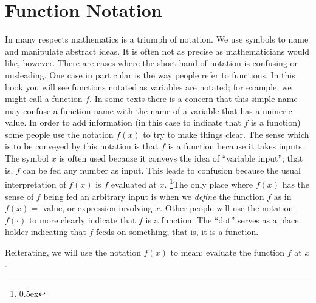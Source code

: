 \section{Function Notation}
In many respects mathematics is a triumph of notation. We use symbols to name 
and manipulate abstract ideas. It is often not as precise as mathematicians 
would like, however. There are cases where the short 
hand of notation is confusing 
or misleading. One case in particular is the way people refer to 
functions.
In this book you will see functions notated as variables are notated; for example, we might call a function $f$.
 In some texts there is a concern that this simple name may confuse a function name with the name 
of a variable that has a numeric value. In order to add information 
(in this case to indicate that $f$ is a function)  some 
people use the notation $f(x)$ to try to make things clear. The sense which is 
to be conveyed by this notation is that $f$ is a function because
it takes inputs. The symbol $x$ is often used because it conveys the 
idea of ``variable input''; that is, $f$ can be fed any number as input.
This leads to confusion because the usual interpretation of $f(x)$ is $f$ evaluated at $x$.%
\footnote{\kern 0.5pt \raise 0.5ex \hbox{\dag}}{The only place where $f(x)$ has the sense of $f$ being fed an arbitrary input is when
we {\it define\/} the function $f$ as in $f(x) = $ value, or expression involving $x$. }
Other people will use the notation $f(\cdot)$ to more clearly indicate that $f$ is a function.
The ``dot'' serves as a place holder indicating that $f$ feeds on something; that is, it is a function.

Reiterating, we will use the notation $f(x)$ to 
mean: evaluate the function $f$ at $x$.

